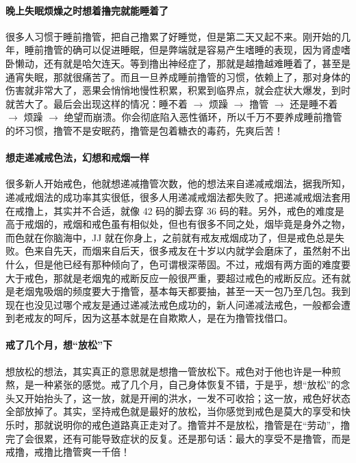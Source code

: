 \paragraph{晚上失眠烦燥之时想着撸完就能睡着了}

很多人习惯于睡前撸管，把自己撸累了好睡觉，但是第二天又起不来。刚开始的几年，睡前撸管的确可以促进睡眠，但是弊端就是容易产生嗜睡的表现，因为肾虚嗜卧懒动，还有就是哈欠连天。等到撸出神经症了，那就是越撸越难睡着了，甚至是通宵失眠，那就很痛苦了。而且一旦养成睡前撸管的习惯，依赖上了，那对身体的伤害就非常大了，恶果会悄悄地慢性积累，积累到临界点，就会症状大爆发，到时就苦大了。最后会出现这样的情况：睡不着 $\to$ 烦躁 $\to$ 撸管 $\to$ 还是睡不着 $\to$ 烦躁 $\to$ 绝望而崩溃。你会彻底陷入恶性循环，所以千万不要养成睡前撸管的坏习惯，撸管不是安眠药，撸管是包着糖衣的毒药，先爽后苦！

\paragraph{想走递减戒色法，幻想和戒烟一样}

很多新人开始戒色，他就想递减撸管次数，他的想法来自递减戒烟法，据我所知，递减戒烟法的成功率其实很低，很多人用递减戒烟法都失败了。把递减戒烟法套用在戒撸上，其实并不合适，就像 42 码的脚去穿 36 码的鞋。另外，戒色的难度是高于戒烟的，戒烟和戒色虽有相似处，但也有很多不同之处，烟毕竟是身外之物，而色就在你脑海中，JJ 就在你身上，之前就有戒友戒烟成功了，但是戒色总是失败。色来自先天，而烟来自后天，很多戒友在十岁以内就学会磨床了，虽然射不出什么，但是他已经有那种倾向了，色可谓根深蒂固。不过，戒烟有两方面的难度要大于戒色，那就是老烟鬼的戒断反应一般很严重，要超过戒色的戒断反应。还有就是老烟鬼吸烟的频度要大于撸管，基本每天都要抽，甚至一天一包乃至几包。我到现在也没见过哪个戒友是通过递减法戒色成功的，新人问递减法戒色，一般都会遭到老戒友的呵斥，因为这基本就是在自欺欺人，是在为撸管找借口。

\paragraph{戒了几个月，想“放松”下}

想放松的想法，其实真正的意思就是想撸一管放松下。戒色对于他也许是一种煎熬，是一种紧张的感觉。戒了几个月，自己身体恢复不错，于是乎，想“放松”的念头又开始抬头了，这一放，就是开闸的洪水，一发不可收拾；这一放，戒色好状态全部放掉了。其实，坚持戒色就是最好的放松，当你感觉到戒色是莫大的享受和快乐时，那就说明你的戒色道路真正走对了。撸管并不是放松，撸管是在“劳动”，撸完了会很累，还有可能导致症状的反复。还是那句话：最大的享受不是撸管，而是戒撸，戒撸比撸管爽一千倍！


